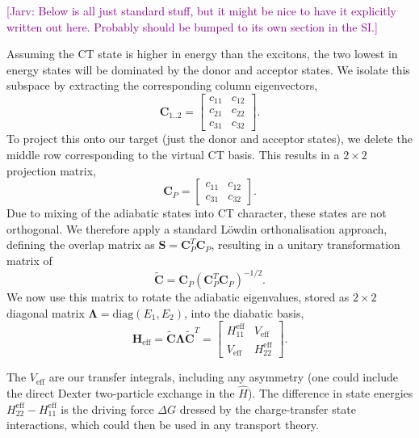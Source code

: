 \documentclass[aps,physrev,reprint,superscriptaddress,nofootinbib,amsmath,amssymb,a4paper]{revtex4-2}
\newcommand{\jarv}[1]{\textcolor{purple}{[Jarv: #1]}}
\begin{document}
\jarv{Below is all just standard stuff, but it might be nice to have it explicitly written out here. Probably should be bumped to its own section in the SI.}

Assuming the CT state is higher in energy than the excitons, the two lowest in energy states will be dominated by the donor and acceptor states. 
We isolate this subspace by extracting the corresponding column eigenvectors, 
\begin{equation}
    \bm{C}_{1..2} =
    \begin{bmatrix}
        c_{11} & c_{12} \\
        c_{21} & c_{22} \\
        c_{31} & c_{32}
    \end{bmatrix} .
\end{equation}
%
To project this onto our target (just the donor and acceptor states), we delete the middle row corresponding to the virtual CT basis. 
This results in a $2 \times 2$ projection matrix, 
\begin{equation}
    \bm{C}_P =
    \begin{bmatrix}
        c_{11} & c_{12} \\
        c_{31} & c_{32}
    \end{bmatrix} .
\end{equation}
%
Due to mixing of the adiabatic states into CT character, these states are not orthogonal. 
We therefore apply a standard L\"owdin orthonalisation approach, defining the overlap matrix as $\bm{S} = \bm{C}_P^T \bm{C}_P$, resulting in a unitary transformation matrix of
\begin{equation}
    \tilde{\bm{C}} = \bm{C}_P (\bm{C}_P^T \bm{C}_P)^{-1/2} .
\end{equation}
%
We now use this matrix to rotate the adiabatic eigenvalues, stored as $2 \times 2$ diagonal matrix $\bm{\Lambda} = \mathrm{diag}(E_1, E_2)$, into the diabatic basis, 
\begin{equation}
    \bm{H}_{\mathrm{eff}} = \tilde{\bm{C}} \bm{\Lambda} \tilde{\bm{C}}^T =
    \begin{bmatrix}
        H_{11}^{\mathrm{eff}} & V_{\mathrm{eff}} \\
        V_{\mathrm{eff}} & H_{22}^{\mathrm{eff}}
    \end{bmatrix} .
\end{equation}

The $V_{\mathrm{eff}}$ are our transfer integrals, including any asymmetry (one could include the direct Dexter two-particle exchange in the $\hat H$). 
The difference in state energies $H_{22}^{\mathrm{eff}} - H_{11}^{\mathrm{eff}}$ is the driving force $\Delta G$ dressed by the charge-transfer state interactions, which could then be used in any transport theory.  
\end{document}

